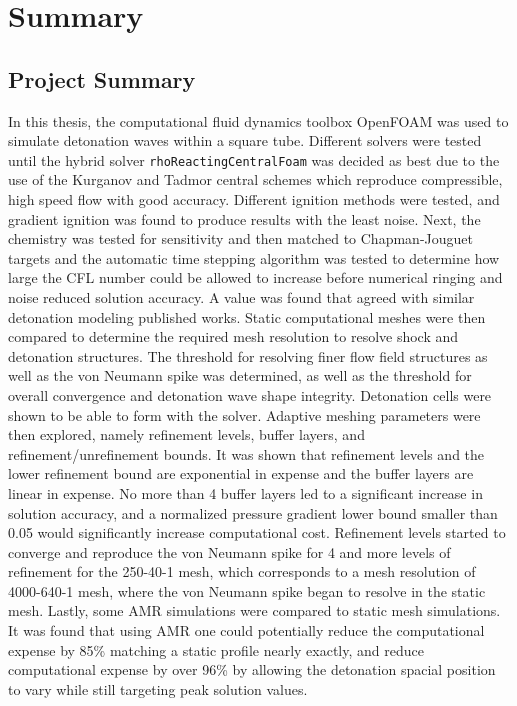 \chapter{Summary}
\label{summary}

\section{Project Summary}
In this thesis, the computational fluid dynamics toolbox OpenFOAM was used to simulate detonation waves within a square tube. Different solvers were tested until the hybrid solver \verb|rhoReactingCentralFoam| was decided as best due to the use of the Kurganov and Tadmor central schemes which reproduce compressible, high speed flow with good accuracy. Different ignition methods were tested, and gradient ignition was found to produce results with the least noise. Next, the chemistry was tested for sensitivity and then matched to Chapman-Jouguet targets and the automatic time stepping algorithm was tested to determine how large the CFL number could be allowed to increase before numerical ringing and noise reduced solution accuracy. A value was found that agreed with similar detonation modeling published works. Static computational meshes were then compared to determine the required mesh resolution to resolve shock and detonation structures. The threshold for resolving finer flow field structures as well as the von Neumann spike was determined, as well as the threshold for overall convergence and detonation wave shape integrity. Detonation cells were shown to be able to form with the solver. Adaptive meshing parameters were then explored, namely refinement levels, buffer layers, and refinement/unrefinement bounds. It was shown that refinement levels and the lower refinement bound are exponential in expense and the buffer layers are linear in expense. No more than 4 buffer layers led to a significant increase in solution accuracy, and a normalized pressure gradient lower bound smaller than 0.05 would significantly increase computational cost. Refinement levels started to converge and reproduce the von Neumann spike for 4 and more levels of refinement for the 250-40-1 mesh, which corresponds to a mesh resolution of 4000-640-1 mesh, where the von Neumann spike began to resolve in the static mesh. Lastly, some AMR simulations were compared to static mesh simulations. It was found that using AMR one could potentially reduce the computational expense by 85\% matching a static profile nearly exactly, and reduce computational expense by over 96\% by allowing the detonation spacial position to vary while still targeting peak solution values. 



